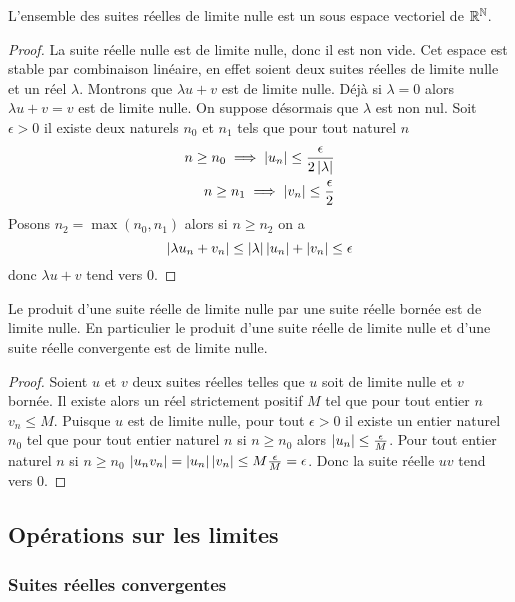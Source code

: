 \begin{prop}
  L'ensemble des suites réelles de limite nulle est un sous espace vectoriel de $\mathbb{R}^{\mathbb{N}}$.
\end{prop}
\begin{proof}
  La suite réelle nulle est de limite nulle, donc il est non vide. Cet espace est stable par combinaison linéaire, en effet soient deux suites réelles de limite nulle et un réel $\lambda$. Montrons que $\lambda u+v$ est de limite nulle. Déjà si $\lambda=0$ alors $\lambda u+v=v$ est de limite nulle. On suppose désormais que $\lambda$ est non nul. Soit $\epsilon>0$ il existe deux naturels $n_0$ et $n_1$ tels que pour tout naturel $n$
  \begin{align}
    n \geq n_0 \implies \left\lvert u_n\right\rvert \leq \frac{\epsilon}{2\left\lvert\lambda\right\rvert} \\ n \geq n_1 \implies \left\lvert v_n\right\rvert \leq \frac{\epsilon}{2}
  \end{align}
  Posons $n_2=\max(n_0,n_1)$ alors si $n \geq n_2$ on a
  \begin{equation}
    \left\lvert\lambda u_n + v_n\right\rvert\leq \left\lvert\lambda\right\rvert\left\lvert u_n\right\rvert+\left\lvert v_n\right\rvert\leq \epsilon
  \end{equation}
  donc $\lambda u+v$ tend vers 0.
\end{proof}
%
\begin{prop}
  Le produit d'une suite réelle de limite nulle par une suite réelle bornée est de limite nulle. En particulier le produit d'une suite réelle de limite nulle et d'une suite réelle convergente est de limite nulle.
\end{prop}
\begin{proof}
  Soient $u$ et $v$ deux suites réelles telles que $u$ soit de limite nulle et $v$ bornée. Il existe alors un réel strictement positif $M$ tel que pour tout entier $n$ $v_n \leq M$. Puisque $u$ est de limite nulle, pour tout $\epsilon>0$ il existe un entier naturel $n_0$ tel que pour tout entier naturel $n$ si $n \geq n_0$ alors $\left\lvert u_n\right\rvert \leq \frac{\epsilon}{M}$. Pour tout entier naturel $n$  si $n \geq n_0$ $\left\lvert u_n v_n\right\rvert=\left\lvert u_n\right\rvert\left\lvert v_n\right\rvert\leq M \frac{\epsilon}{M}=\epsilon$. Donc la suite réelle $uv$ tend vers 0.
\end{proof}

\subsection{Opérations sur les limites}

\subsubsection{Suites réelles convergentes}

